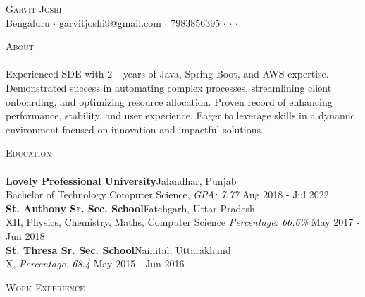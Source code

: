 \documentclass[a4paper]{article}
\newcommand{\lineunder} {
    \vspace*{-8pt} \\
    \hspace*{-18pt} \hrulefill \\
}
\newcommand{\header} [1] {
    {\hspace*{-18pt}\vspace*{6pt} \textsc{#1}}
    \vspace*{-6pt} \lineunder
}
\begin{document}
\vspace*{-40pt}

    

\vspace*{-10pt}
\begin{center}
	{\Huge \scshape {Garvit Joshi}}\\
	Bengaluru $\cdot$ \href{mailto:garvitjoshi9@gmail.com}{garvitjoshi9@gmail.com} $\cdot$ \href{tel:7983856395}{7983856395} $\cdot$ \href{https://garvit-joshi.github.io}{\faBriefcase} $\cdot$ \href{https://www.linkedin.com/in/garvitjoshi9/}{\faLinkedin} $\cdot$ \href{https://github.com/garvit-joshi/}{\faGithub}\\
\end{center}

\header{About}
Experienced SDE with 2+ years of Java, Spring Boot, and AWS expertise. Demonstrated success in automating complex processes, streamlining client onboarding, and optimizing resource allocation. Proven record of enhancing performance, stability, and user experience. Eager to leverage skills in a dynamic environment focused on innovation and impactful solutions.

\header{Education}
\textbf{Lovely Professional University}\hfill Jalandhar, Punjab\\
Bachelor of Technology Computer Science, \textit{GPA: 7.77} \hfill Aug 2018 - Jul 2022\\
\vspace{2mm}
\textbf{St. Anthony Sr. Sec. School}\hfill Fatehgarh, Uttar Pradesh\\
XII, Physics, Chemistry, Maths, Computer Science \textit{Percentage: 66.6\%} \hfill May 2017 - Jun 2018\\
\vspace{2mm}
\textbf{St. Thresa Sr. Sec. School}\hfill Nainital, Uttarakhand\\
X, \textit{Percentage: 68.4} \hfill May 2015 - Jun 2016\\
\vspace{2mm}

\header{Work Experience}
\vspace{1mm}
\end{document}

